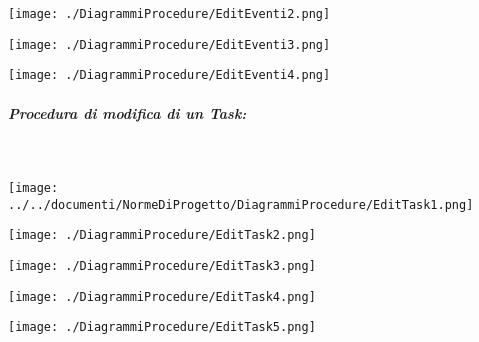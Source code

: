 \begin{center}
	\texttt{[image: ./DiagrammiProcedure/EditEventi2.png]}
\end{center}

\begin{center}
	\texttt{[image: ./DiagrammiProcedure/EditEventi3.png]}
\end{center}

\begin{center}
	\texttt{[image: ./DiagrammiProcedure/EditEventi4.png]}
\end{center}

\begin{samepage}
	\subparagraph{Procedura di modifica di un Task:}\mbox{}\\
	
	\begin{center}
		\texttt{[image: ../../documenti/NormeDiProgetto/DiagrammiProcedure/EditTask1.png]}
	\end{center}
	
\end{samepage}

\begin{center}
	\texttt{[image: ./DiagrammiProcedure/EditTask2.png]}
\end{center}

\begin{center}
	\texttt{[image: ./DiagrammiProcedure/EditTask3.png]}
\end{center}

\begin{center}
	\texttt{[image: ./DiagrammiProcedure/EditTask4.png]}
\end{center}

\begin{center}
	\texttt{[image: ./DiagrammiProcedure/EditTask5.png]}
\end{center}

